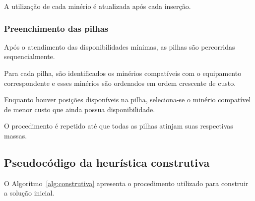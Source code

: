 \documentclass[12pt,a4paper]{article}
\begin{document}
A utilização de cada minério é atualizada após cada inserção.


\subsubsection{Preenchimento das pilhas}

Após o atendimento das disponibilidades mínimas, as pilhas são percorridas
sequencialmente.

Para cada pilha, são identificados os minérios compatíveis com o
equipamento correspondente e esses minérios são ordenados em ordem
crescente de custo.

Enquanto houver posições disponíveis na pilha, seleciona-se o minério
compatível de menor custo que ainda possua disponibilidade.

O procedimento é repetido até que todas as pilhas atinjam suas respectivas
massas.



\subsection{Pseudocódigo da heurística construtiva}

O Algoritmo~\ref{alg:construtiva} apresenta o procedimento utilizado
para construir a solução inicial.
\end{document}
